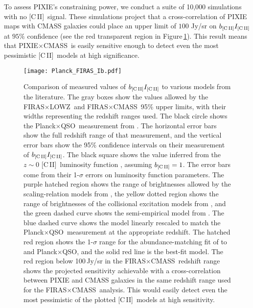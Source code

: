 \documentclass[fleqn,usenatbib]{mnras}
\newcommand{\cii}{[C{\sc\,II}]}
\newcommand{\PB}{Planck${\times}$QSO}
\newcommand{\PIB}{PIXIE${\times}$CMASS}
\newcommand{\FLZ}{FIRAS${\times}$LOWZ}
\newcommand{\FC}{FIRAS${\times}$CMASS}
\begin{document}
To assess PIXIE's constraining power, we conduct a suite of 10,000 simulations with no \cii\ signal. These simulations project that a cross-correlation of PIXIE maps with CMASS galaxies could place an upper limit of $100$ Jy/sr on $b_{\rm \cii}I_{\rm \cii}$ at $95\%$ confidence (see the red transparent region in Figure\,\ref{fig:Ib_models}). This result means that \PIB\, is easily sensitive enough to detect even the most pessimistic \cii\ models at high significance. 

\begin{figure}
  \texttt{[image: Planck\_FIRAS\_Ib.pdf]}
  \caption{Comparison of measured values of $b_{\rm \cii}I_{\rm \cii}$ to various models from the literature.  The gray boxes show the values allowed by the \FLZ\, and \FC\, 95\% upper limits, with their widths representing the redshift ranges used. The black circle shows the \PB\, measurement from \citet{yang2019evidence}. The horizontal error bars show the full redshift range of that measurement, and the vertical error bars show the 95\% confidence intervals on their measurement of $b_{\rm \cii}I_{\rm \cii}$. The black square shows the value inferred from the $z\sim0$ \cii\ luminosity function \citep{2017ApJ...834...36H}, assuming $b_{\rm \cii}=1$. The error bars come from their 1-$\sigma$ errors on luminosity function parameters. 
  The purple hatched region shows the range of brightnesses allowed by the scaling-relation models from \citet{Silva2015}, the yellow dotted region shows the range of brightnesses of the collisional excitation models from \citet{Gong2012}, and the green dashed curve shows the semi-empirical model from \citet{Sun2019}.  The blue dashed curve shows the \citet{Sun2019} model linearly rescaled to match the \PB\, measurement at the appropriate redshift. The hatched red region shows the 1-$\sigma$ range for the abundance-matching fit of \citet{2019MNRAS.488.3014P} to \citet{2017ApJ...834...36H} and \PB, and the solid red line is the best-fit model. 
  The red region below 100\,Jy/sr in the \FC\, redshift range shows the projected sensitivity achievable with a cross-correlation between PIXIE and CMASS galaxies in the same redshift range used for the \FC\, analysis. This would easily detect even the most pessimistic of the plotted \cii\ models at high sensitivity.}
  \label{fig:Ib_models}
\end{figure}
\end{document}
